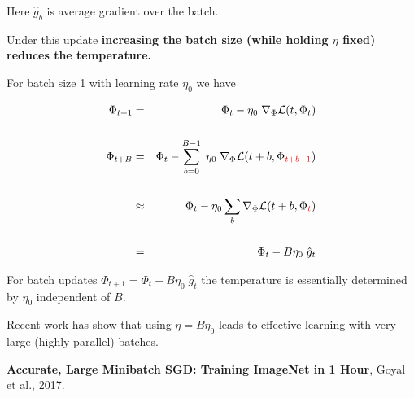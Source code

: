 {\vfill
Here $\hat{g}_{b}$ is average gradient over the batch.

\vfill
Under this update {\bf increasing the batch size (while holding $\eta$ fixed) reduces the temperature.}


For batch size 1 with learning rate $\eta_0$ we have

\begin{eqnarray*}
\Phi_{t+1} & = &  \Phi_{t} - \eta_0\;\nabla_\Phi {\cal L}(t,\Phi_{t}) \\
\\
\Phi_{t+B} & = &  \Phi_{t} - \sum_{b=0}^{B-1} \;\eta_0\;\nabla_\Phi {\cal L}(t+b,\Phi_{\color{red} t+b-1}) \\
\\
& \approx & \Phi_t - \eta_0 \sum_b \nabla_\Phi {\cal L}(t+b,\Phi_{\color{red} t}) \\
\\
& = & \Phi_t - B\eta_0\; \hat{g}_t
\end{eqnarray*}

\vfill
For batch updates $\Phi_{t+1} = \Phi_t - B\eta_0\; \hat{g}_t$ the temperature is essentially determined by $\eta_0$ independent of $B$.


Recent work has show that using $\eta = B\eta_0$ leads to effective learning with very large (highly parallel)
batches.

\vfill
{\bf Accurate, Large Minibatch SGD: Training ImageNet in 1 Hour}, Goyal et al., 2017.


} 

